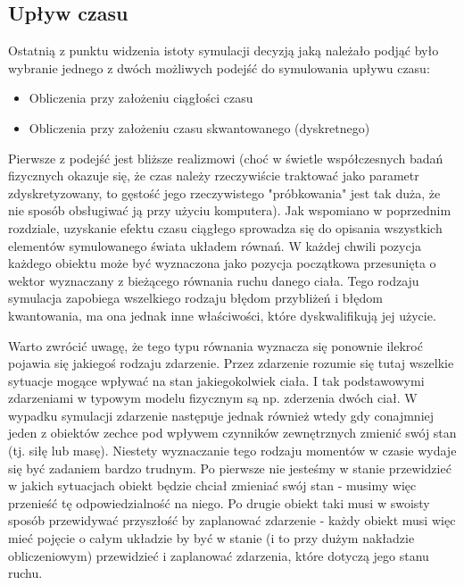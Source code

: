 {\subsection{Upływ czasu}
\par{
Ostatnią z punktu widzenia istoty symulacji decyzją jaką należało podjąć było wybranie jednego z dwóch możliwych podejść do symulowania upływu czasu:

\begin{itemize}
\item Obliczenia przy założeniu ciągłości czasu
\item Obliczenia przy założeniu czasu skwantowanego (dyskretnego)
\end{itemize}
}
\par{
Pierwsze z podejść jest bliższe realizmowi (choć w świetle współczesnych badań fizycznych okazuje się, że czas należy rzeczywiście traktować jako parametr zdyskretyzowany, to gęstość jego rzeczywistego "próbkowania" jest tak duża, że nie sposób obsługiwać ją przy użyciu komputera).
Jak wspomiano w poprzednim rozdziale, uzyskanie efektu czasu ciągłego sprowadza się do opisania wszystkich elementów symulowanego świata układem równań. W każdej chwili pozycja każdego obiektu może być wyznaczona jako pozycja początkowa przesunięta o wektor wyznaczany z bieżącego równania ruchu danego ciała. Tego rodzaju symulacja zapobiega wszelkiego rodzaju błędom przybliżeń i błędom kwantowania, ma ona jednak inne właściwości, które dyskwalifikują jej użycie.
}
\par{
Warto zwrócić uwagę, że tego typu równania wyznacza się ponownie ilekroć pojawia się jakiegoś rodzaju zdarzenie. Przez zdarzenie rozumie się tutaj wszelkie sytuacje mogące wpływać na stan jakiegokolwiek ciała. I tak podstawowymi zdarzeniami w typowym modelu fizycznym są np. zderzenia dwóch ciał. W wypadku symulacji zdarzenie następuje jednak również wtedy gdy conajmniej jeden z obiektów zechce pod wpływem czynników zewnętrznych zmienić swój stan (tj. siłę lub masę). Niestety wyznaczanie tego rodzaju momentów w czasie wydaje się być zadaniem bardzo trudnym. Po pierwsze nie jesteśmy w stanie przewidzieć w jakich sytuacjach obiekt będzie chciał zmieniać swój stan - musimy więc przenieść tę odpowiedzialność na niego. Po drugie obiekt taki musi w swoisty sposób przewidywać przyszłość by zaplanować zdarzenie - każdy obiekt musi więc mieć pojęcie o całym układzie by być w stanie (i to przy dużym nakładzie obliczeniowym) przewidzieć i zaplanować zdarzenia, które dotyczą jego stanu ruchu.
}
\par{
}}
